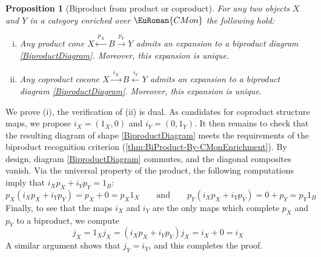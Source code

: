 \documentclass [12pt,oneside]{book}%
\makeatletter
\theoremstyle{captionstyle}  %
\newtheorem{proposition}[theorem]{Proposition}
\renewenvironment{proof}[1][\proofname]{\vspace{-2ex}\par       %
	\pushQED{\qed}%
	\normalfont \topsep6\p@\@plus6\p@\relax
	\trivlist
	\item[\hskip\labelsep
	            \color{proofcaption}\bfseries                %
	            #1\@addpunct{\quad}]\ignorespaces
}{%
	\popQED\endtrivlist\@endpefalse
}
\newcommand{\XRA}[1]{\xrightarrow{\ #1\ }}
\newcommand{\XLA}[1]{\xleftarrow{\ #1\ }}
\newcommand{\IdMapOn}[1]{1_{#1}}	%
\newcommand{\CMon}{\ensuremath{\EuRoman{CMon}}}
\newcommand{\ZeroMap}{0}                                %
\makeatother
\begin{document}
\begin{proposition}[Biproduct from product or coproduct]
    \label{thm:BiProduct-From-(Co)Product}
    For any two objects $X$ and $Y$ in a category enriched over $\CMon$ the following hold:
    \begin{enumerate}[(i)]
        \item Any product cone $X \XLA{p_X} B \XRA{p_Y} Y$ admits an expansion to a biproduct diagram \eqref{BiproductDiagram}. Moreover, this expansion is unique.
        \item Any coproduct cocone $X \XRA{i_X} B \XLA{i_Y} Y$ admits an expansion to a biproduct diagram \eqref{BiproductDiagram}. Moreover, this expansion is unique.
    \end{enumerate}
\end{proposition}
\begin{proof}
    We prove (i), the verification of (ii) is dual. As candidates for coproduct structure maps, we propose $i_X=(1_X,0)$ and $i_Y=(0,1_Y)$. It then remains to check that the resulting diagram of shape \eqref{BiproductDiagram} meets the requirements of the biproduct recognition criterion (\ref{thm:BiProduct-By-CMonEnrichment}). By design, diagram \eqref{BiproductDiagram} commutes, and the diagonal composites vanish. Via the universal property of the product, the following computations imply that $i_Xp_X + i_Yp_Y = \IdMapOn{B}$:
    \begin{equation*}
        p_X(i_Xp_X + i_Yp_Y) = p_X + \ZeroMap = p_X\IdMapOn{X} \qquad \text{and}\qquad p_Y(i_Xp_X + i_Yp_Y) = \ZeroMap + p_Y = p_Y\IdMapOn{B}
    \end{equation*}
    Finally, to see that the maps $i_X$ and $i_Y$ are the only maps which complete $p_X$ and $p_Y$ to a biproduct, we compute
    \begin{equation*}
        j_X = \IdMapOn{X}j_X = (i_Xp_X + i_Yp_Y)j_X = i_X + \ZeroMap = i_X
    \end{equation*}
    A similar argument shows that $j_Y=i_Y$, and this completes the proof.
\end{proof}
\end{document}
